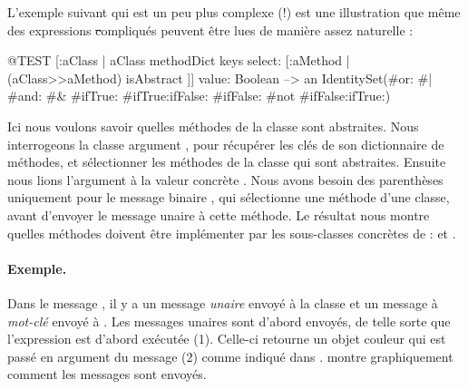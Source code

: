\documentclass[a4paper,10pt,twoside]{book}
\begin{document}
L'exemple suivant qui est un peu plus complexe (!) est une illustration que m\^eme des expressions \st compliqu\'es peuvent \^etre lues de mani\`ere assez naturelle : 
\begin{code}{@TEST}
[:aClass | aClass methodDict keys select: [:aMethod | (aClass>>aMethod) isAbstract ]] value: Boolean --> an IdentitySet(#or: #| #and: #& #ifTrue: #ifTrue:ifFalse: #ifFalse: #not #ifFalse:ifTrue:)
\end{code}
\noindent
Ici nous voulons savoir quelles m\'ethodes de la classe sont abstraites.
Nous interrogeons la classe argument , pour r\'ecup\'erer les cl\'es de son dictionnaire de m\'ethodes, et s\'electionner les m\'ethodes de la classe qui sont abstraites.
Ensuite nous lions l'argument  \`a la valeur concr\`ete .
Nous avons besoin des parenth\`eses uniquement pour le message binaire \ct{>>}, qui s\'electionne une m\'ethode d'une classe, avant d'envoyer le message unaire \mbox{} \`a cette m\'ethode. Le r\'esultat nous montre quelles m\'ethodes doivent \^etre impl\'ementer par les sous-classes concr\`etes de  :  et .



\paragraph{Exemple.}
Dans le message , il y a un message \emph{unaire}  envoy\'e \`a la classe  et un message \`a \emph{mot-cl\'e}  envoy\'e \`a . Les messages unaires sont d'abord envoy\'es, de telle sorte que l'expression  est d'abord ex\'ecut\'ee (1). Celle-ci retourne un objet couleur qui est pass\'e en argument du message  (2) comme indiqu\'e dans .
 montre graphiquement comment les messages sont envoy\'es.
\end{document}
